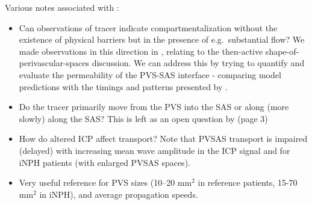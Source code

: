 \documentclass[fleqn,10pt]{wlscirep}
\begin{document}
Various notes associated with \cite{eide2024functional}:
\begin{itemize}
  \item
    Can observations of tracer indicate compartmentalization without
    the existence of physical barriers but in the presence of
    e.g.~substantial flow? We made observations in this direction in
    \cite{vinje2021brain}, relating to the then-active
    shape-of-perivascular-spaces discussion. We can address this by
    trying to quantify and evaluate the permeability of the PVS-SAS
    interface - comparing model predictions with the timings and
    patterns presented by \cite{eide2024functional}.
  \item
    Do the tracer primarily move from the PVS into the SAS or along
    (more slowly) along the SAS? This is left as an open question by
    \cite{eide2024functional} (page 3)
  \item
    How do altered ICP affect transport? Note that PVSAS transport is
    impaired (delayed) with increasing mean wave amplitude in the ICP
    signal and for iNPH patients (with enlarged PVSAS spaces).
  \item
    Very useful reference for PVS sizes (10--20 mm$^2$ in reference
    patients, 15-70 mm$^2$ in iNPH), and average propagation speeds.
\end{itemize}
\end{document}
